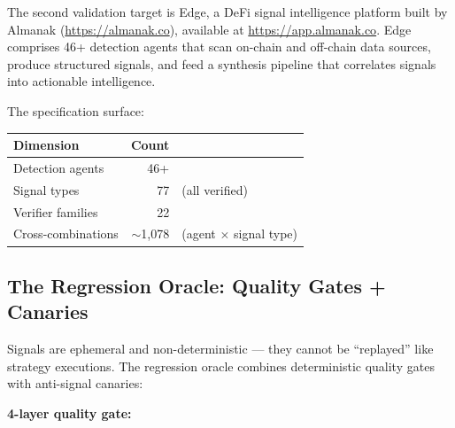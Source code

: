 \documentclass[11pt,a4paper]{article}
\begin{document}
The second validation target is Edge, a DeFi signal intelligence platform built by Almanak (\url{https://almanak.co}), available at \url{https://app.almanak.co}. Edge comprises 46+ detection agents that scan on-chain and off-chain data sources, produce structured signals, and feed a synthesis pipeline that correlates signals into actionable intelligence.

The specification surface:

\begin{table}[ht]
\centering
\small
\renewcommand{\arraystretch}{1.3}
\begin{tabular}{@{} l r l @{}}
\toprule
\textbf{Dimension} & \textbf{Count} & \\
\midrule
Detection agents    & 46+   & \\
Signal types        & 77    & (all verified) \\
Verifier families   & 22    & \\
Cross-combinations  & $\sim$1{,}078 & (agent $\times$ signal type) \\
\bottomrule
\end{tabular}
\end{table}

\subsection{The Regression Oracle: Quality Gates + Canaries}\label{sec:regression-oracle-quality-gates-canaries}

Signals are ephemeral and non-deterministic --- they cannot be ``replayed'' like strategy executions. The regression oracle combines deterministic quality gates with anti-signal canaries:

\textbf{4-layer quality gate:}
\end{document}
